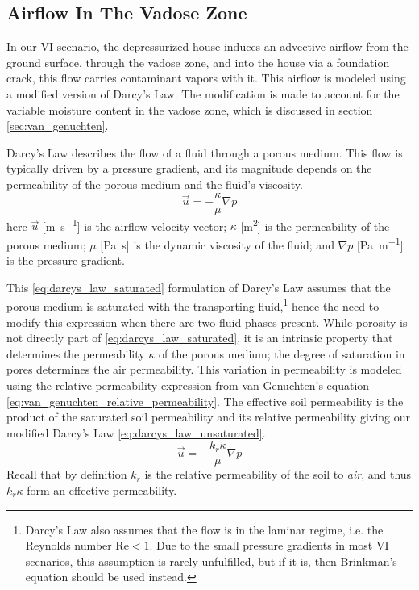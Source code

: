 \subsection{Airflow In The Vadose Zone}\label{sec:darcys_law}

In our VI scenario, the depressurized house induces an advective airflow from the ground surface, through the vadose zone, and into the house via a foundation crack, this flow carries contaminant vapors with it.
This airflow is modeled using a modified version of Darcy's Law.
The modification is made to account for the variable moisture content in the vadose zone, which is discussed in section \ref{sec:van_genuchten}.\par

Darcy's Law describes the flow of a fluid through a porous medium.
This flow is typically driven by a pressure gradient, and its magnitude depends on the permeability of the porous medium and the fluid's viscosity.
\begin{equation}\label{eq:darcys_law_saturated}
  \vec{u} = -\frac{\kappa}{\mu} \nabla p
\end{equation}
here $\vec{u}$ [\si{\m\per\second}] is the airflow velocity vector;
$\kappa$ [\si{\metre\squared}] is the permeability of the porous medium;
$\mu$ [\si{\pascal\second}] is the dynamic viscosity of the fluid;
and $\nabla p$ [\si{\pascal\per\metre}] is the pressure gradient.\par

This \eqref{eq:darcys_law_saturated} formulation of Darcy's Law assumes that the porous medium is saturated with the transporting fluid,\footnote{Darcy's Law also assumes that the flow is in the laminar regime, i.e. the Reynolds number $\mathrm{Re} < 1$.
Due to the small pressure gradients in most VI scenarios, this assumption is rarely unfulfilled, but if it is, then Brinkman's equation should be used instead.}
hence the need to modify this expression when there are two fluid phases present.
While porosity is not directly part of \eqref{eq:darcys_law_saturated}, it is an intrinsic property that determines the permeability $\kappa$ of the porous medium; the degree of saturation in pores determines the air permeability.
This variation in permeability is modeled using the relative permeability expression from van Genuchten's equation \eqref{eq:van_genuchten_relative_permeability}.
The effective soil permeability is the product of the saturated soil permeability and its relative permeability giving our modified Darcy's Law \eqref{eq:darcys_law_unsaturated}.
\begin{equation}\label{eq:darcys_law_unsaturated}
  \vec{u} = -\frac{k_r\kappa}{\mu} \nabla p
\end{equation}
Recall that by definition $k_r$ is the relative permeability of the soil to \textit{air}, and thus $k_r\kappa$ form an effective permeability.\par

